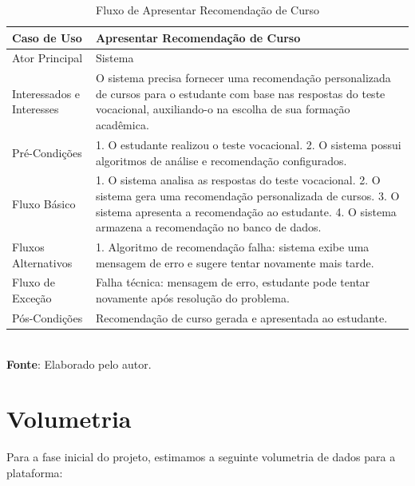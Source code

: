 \begin{table}[h!]
\centering
\caption{Fluxo de Apresentar Recomendação de Curso}
\begin{tabular}{|m{4cm}|m{11cm}|}
\hline
\textbf{Caso de Uso}   & \textbf{Apresentar Recomendação de Curso} \\
\hline
Ator Principal & Sistema\\
\hline
Interessados e Interesses & O sistema precisa fornecer uma recomendação personalizada de cursos para o estudante com base nas respostas do teste vocacional, auxiliando-o na escolha de sua formação acadêmica. \\
\hline
Pré-Condições & 

1. O estudante realizou o teste vocacional.
2. O sistema possui algoritmos de análise e recomendação configurados. \\
\hline
Fluxo Básico & 
1. O sistema analisa as respostas do teste vocacional.
2. O sistema gera uma recomendação personalizada de cursos.
3. O sistema apresenta a recomendação ao estudante.
4. O sistema armazena a recomendação no banco de dados.
\\
\hline
Fluxos Alternativos & 

1. Algoritmo de recomendação falha: sistema exibe uma mensagem de erro e sugere tentar novamente mais tarde.
\\
\hline
Fluxo de Exceção & Falha técnica: mensagem de erro, estudante pode tentar novamente após resolução do problema. \\
\hline
Pós-Condições & Recomendação de curso gerada e apresentada ao estudante.\\
\hline
\end{tabular}
\label{table:casos-de-uso}
\\[1ex]
\footnotesize \textbf{Fonte}: Elaborado pelo autor.
\end{table}

\clearpage

\section{Volumetria}

Para a fase inicial do projeto, estimamos a seguinte volumetria de dados para a plataforma:

